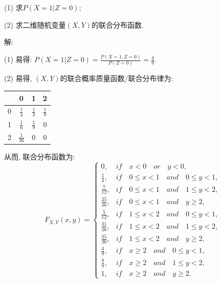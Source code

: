 \documentclass[standard]{ExBook}
\begin{document}
\begin{qitems}
\begin{bbox}
\begin{shaded}
(1) 求$P(X = 1 | Z = 0)$;

(2) 求二维随机变量$(X,Y)$的联合分布函数.
    \end{shaded}
    \end{bbox}

\vspace{-5em}

    \begin{bbox}
解: 

(1) 易得: $P(X=1|Z=0)=\frac{P(X=1,Z=0)}{P(Z=0)}=\frac{4}{9}$.
    \end{bbox}

\vspace{-5em}

    \begin{bbox}
(2) 易得, $(X,Y)$的联合概率质量函数/联合分布律为:
\begin{footnotesize}
\begin{center}
    \renewcommand{\arraystretch}{1.5}
    \setlength{\tabcolsep}{25pt}
    \begin{tabular}{c|c|c|c}
	    \hline
	    \diagbox{$X$}{$P(X,Y)$}{$Y$} & 0 & 1 & 2 \\
	    \hline
	    0 & $\displaystyle\frac{1}{4}$ & $\displaystyle\frac{1}{3}$ & $\displaystyle\frac{1}{9}$\\
	    \hline
	    1 & $\displaystyle\frac{1}{6}$ & $\displaystyle\frac{1}{9}$ & 0\\
	    \hline
        2 & $\displaystyle\frac{1}{36}$ & 0 & 0 \\
        \hline
    \end{tabular}
\end{center}
\end{footnotesize}
从而, 联合分布函数为:
\[
F_{X,Y}(x, y) = 
\begin{cases} 
0, & if\quad x < 0\quad or\quad y < 0, \\
\frac{1}{4}, & if\quad 0 \leq x < 1\quad and\quad 0 \leq y < 1, \\
\frac{7}{12}, & if\quad 0 \leq x < 1\quad and\quad 1 \leq y < 2, \\
\frac{25}{36}, & if\quad 0 \leq x < 1\quad and\quad y \geq 2, \\
\frac{5}{12}, & if\quad 1 \leq x < 2\quad and\quad 0 \leq y < 1, \\
\frac{31}{36}, & if\quad 1 \leq x < 2\quad and\quad 1 \leq y < 2, \\
\frac{35}{36}, & if\quad 1 \leq x < 2\quad and\quad y \geq 2, \\
\frac{4}{9}, & if\quad x \geq 2\quad and\quad 0 \leq y < 1, \\
\frac{8}{9}, & if\quad x \geq 2\quad and\quad 1 \leq y < 2, \\
1, & if\quad x \geq 2\quad and\quad y \geq 2.
\end{cases}
\]
    \end{bbox}


\end{qitems}
\end{document}
